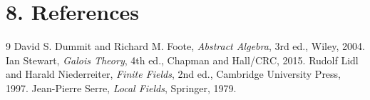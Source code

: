 \section*{8. References}

\begin{thebibliography}{9}
 David S. Dummit and Richard M. Foote, \emph{Abstract Algebra}, 3rd ed., Wiley, 2004.
 Ian Stewart, \emph{Galois Theory}, 4th ed., Chapman and Hall/CRC, 2015.
 Rudolf Lidl and Harald Niederreiter, \emph{Finite Fields}, 2nd ed., Cambridge University Press, 1997.
 Jean-Pierre Serre, \emph{Local Fields}, Springer, 1979.
\end{thebibliography}

